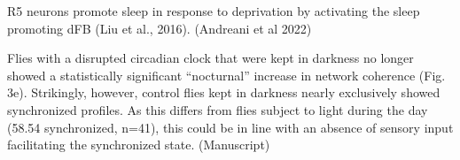 \documentclass[12pt]{article}
\begin{document}
R5 neurons promote sleep in response to deprivation by activating the sleep promoting
dFB (Liu et al., 2016).
\cite{andreaniCircadianProgrammingEllipsoid2022} (Andreani et al 2022)

\color{black}

Flies with a disrupted circadian clock that were kept in
darkness no longer showed a statistically significant “nocturnal” increase in network
coherence (Fig. 3e). Strikingly, however, control flies kept in darkness nearly exclusively showed synchronized
profiles. As this differs from flies subject to light during the day (58.54%
synchronized, n=41), this could be in line with an absence of sensory input facilitating the
synchronized state.\cite{raccugliaCoherentMultilevelNetwork2022} (Manuscript)
\end{document}
